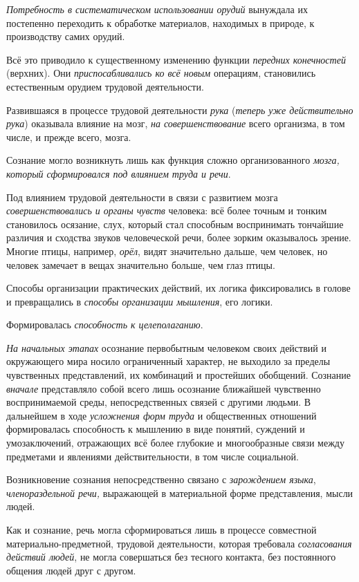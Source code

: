 \documentclass[a4paper,14pt,russian]{extreport}
\begin{document}
\emph{Потребность в систематическом использовании орудий} вынуждала их постепенно переходить к обработке материалов, находимых в природе, к производству самих орудий.

Всё это приводило к существенному изменению функции \emph{передних конечностей} (верхних). Они \emph{приспосабливались ко всё новым} операциям, становились естественным орудием трудовой деятельности.

Развившаяся в процессе трудовой деятельности \emph{рука} (\emph{теперь уже действительно рука}) оказывала влияние на мозг, \emph{на совершенствование} всего организма, в том числе, и прежде всего, мозга.

Сознание могло возникнуть лишь как функция сложно организованного \emph{мозга, который сформировался под влиянием труда и речи}.

Под влиянием трудовой деятельности в связи с развитием мозга \emph{совершенствовались и органы чувств} человека: всё более точным и тонким становилось осязание, слух, который стал способным воспринимать тончайшие различия и сходства звуков человеческой речи, более зорким оказывалось зрение. Многие птицы, например, \emph{орёл}, видят значительно дальше, чем человек, но человек замечает в вещах значительно больше, чем глаз птицы.

Способы организации практических действий, их логика фиксировались в голове и превращались в \emph{способы организации мышления}, его логики.

Формировалась \emph{способность к целеполаганию}.

\emph{На начальных этапах} осознание первобытным человеком своих действий и окружающего мира носило ограниченный характер, не выходило за пределы чувственных представлений, их комбинаций и простейших обобщений. Сознание \emph{вначале} представляло собой всего лишь осознание ближайшей чувственно воспринимаемой среды, непосредственных связей с другими людьми. В дальнейшем в ходе \emph{усложнения форм труда} и общественных отношений формировалась способность к мышлению в виде понятий, суждений и умозаключений, отражающих всё более глубокие и многообразные связи между предметами и явлениями действительности, в том числе социальной.

Возникновение сознания непосредственно связано с \emph{зарождением языка}, \emph{членораздельной речи,} выражающей в материальной форме представления, мысли людей.

Как и сознание, речь могла сформироваться лишь в процессе совместной материально-предметной, трудовой деятельности, которая требовала \emph{согласования действий людей}, не могла совершаться без тесного контакта, без постоянного общения людей друг с другом.
\end{document}
